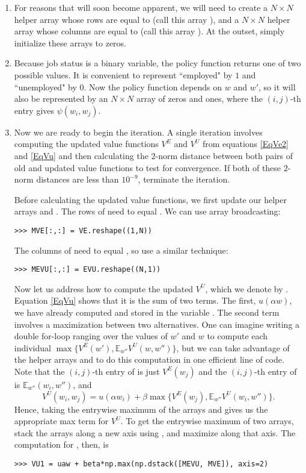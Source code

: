 \begin{problem}
\begin{enumerate}
   \item For reasons that will soon become apparent, we will need to create a $N\times N$ helper array
   whose rows are equal to  (call this array ), and a $N \times N$ helper array whose columns
   are equal to  (call this array ).
   At the outset, simply initialize these arrays to zeros.

   \item Because job status is a binary variable, the policy function returns one of two possible values. It is
   convenient to represent ``employed" by $1$ and ``unemployed" by $0$. Now the policy function depends
   on $w$ and $w'$, so it will also be represented by an $N\times N$ array  of zeros and ones,
   where the $(i,j)$-th entry gives $\psi(w_i, w_j)$.

   \item Now we are ready to begin the iteration.
   A single iteration involves computing the updated value functions $V^E$ and $V^U$ from
   equations \eqref{EqVe2} and \eqref{EqVu} and then calculating the $2$-norm distance between
   both pairs of old and updated value functions to test for convergence. If both of these
   $2$-norm distances are less than $10^{-9}$, terminate the iteration.

   Before calculating the updated value functions, we first update our helper arrays  and
   . The rows of  need to equal . We can use array broadcasting:
\begin{lstlisting}
>>> MVE[:,:] = VE.reshape((1,N))
\end{lstlisting}
   The columns of  need to equal , so use a similar technique:
\begin{lstlisting}
>>> MEVU[:,:] = EVU.reshape((N,1))
\end{lstlisting}

   Now let us address how to compute the updated $V^U$, which we denote by .
   Equation \eqref{EqVu} shows that it is the sum of
   two terms. The first, $u(\alpha w)$, we have already computed and stored in the variable .
   The second term involves a maximization between two alternatives. One can imagine writing
   a double for-loop ranging over the values of $w'$ and $w$ to compute each individual
   $\max\{V^E(w'), \mathbb{E}_{w''}V^U(w,w'')\}$, but we can take advantage of the helper
   arrays  and  to do this computation in one efficient line of code.
   Note that the $(i,j)$-th entry of  is just $V^E(w_j)$ and the $(i,j)$-th
   entry of  is $\mathbb{E}_{w''}(w_i, w'')$, and
   \[
   V^U(w_i,w_j) = u(\alpha w_i) + \beta\max\{V^E(w_j), \mathbb{E}_{w''}V^U(w_i,w'')\}.
   \]
   Hence, taking the entrywise maximum of the arrays  and  gives us the appropriate
   max term for $V^U$. To get the entrywise maximum of two arrays, stack the arrays along a new
   axis using , and maximize along that axis. The computation for , then, is
   \begin{lstlisting}
>>> VU1 = uaw + beta*np.max(np.dstack([MEVU, MVE]), axis=2)
   \end{lstlisting}


\end{enumerate}
\end{problem}
